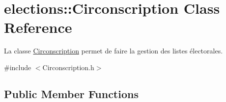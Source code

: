 \hypertarget{classelections_1_1Circonscription}{}\section{elections\+:\+:Circonscription Class Reference}
\label{classelections_1_1Circonscription}


La classe \hyperlink{classelections_1_1Circonscription}{Circonscription} permet de faire la gestion des listes électorales.  




{\ttfamily \#include $<$Circonscription.\+h$>$}

\subsection*{Public Member Functions}
